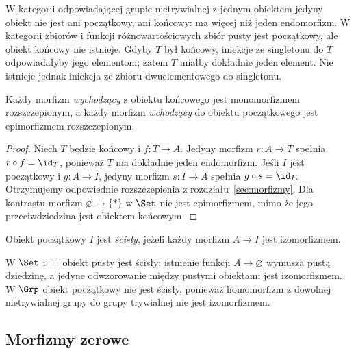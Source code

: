 \begin{przyklad}
W kategorii odpowiadającej grupie nietrywialnej z jednym obiektem jedyny obiekt nie jest ani początkowy, ani końcowy: ma więcej niż jeden endomorfizm. W kategorii zbiorów i funkcji różnowartościowych zbiór pusty jest początkowy, ale obiekt końcowy nie istnieje. Gdyby $T$ był końcowy, iniekcje ze singletonu do $T$ odpowiadałyby jego elementom; zatem $T$ miałby dokładnie jeden element. Nie istnieje jednak iniekcja ze zbioru dwuelementowego do singletonu.
\end{przyklad}

\begin{stwierdzenie}\label{cat:prop:initial-terminal-arrows}
Każdy morfizm \emph{wychodzący} z obiektu końcowego jest monomorfizmem rozszczepionym, a każdy morfizm \emph{wchodzący} do obiektu początkowego jest epimorfizmem rozszczepionym.
\end{stwierdzenie}
\begin{proof}
Niech $T$ będzie końcowy i $f:T\to A$. Jedyny morfizm $r:A\to T$ spełnia $r\circ f=\id_T$, ponieważ $T$ ma dokładnie jeden endomorfizm. Jeśli $I$ jest początkowy i $g:A\to I$, jedyny morfizm $s:I\to A$ spełnia $g\circ s=\id_I$. Otrzymujemy odpowiednie rozszczepienia z rozdziału~\ref{sec:morfizmy}. Dla kontrastu morfizm $\varnothing\to\{*\}$ w $\Set$ nie jest epimorfizmem, mimo że jego przeciwdziedzina jest obiektem końcowym.
\end{proof}

\begin{definicja}\label{cat:def:strict-initial}
Obiekt początkowy $I$ jest \emph{ścisły}, jeżeli każdy morfizm $A\to I$ jest izomorfizmem.
\end{definicja}

\begin{przyklad}
W $\Set$ i $\Top$ obiekt pusty jest ścisły: istnienie funkcji $A\to\varnothing$ wymusza pustą dziedzinę, a jedyne odwzorowanie między pustymi obiektami jest izomorfizmem. W $\Grp$ obiekt początkowy nie jest ścisły, ponieważ homomorfizm z dowolnej nietrywialnej grupy do grupy trywialnej nie jest izomorfizmem.
\end{przyklad}

\subsection{Morfizmy zerowe}


